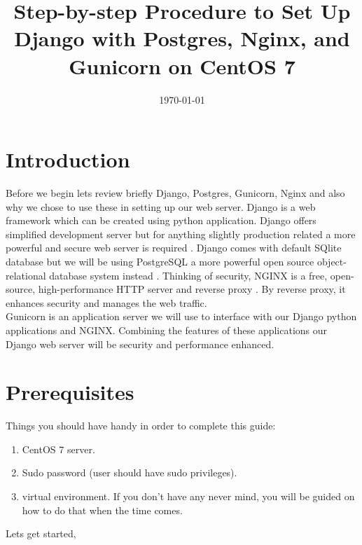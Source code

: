 \documentclass[a4paper]{article}
\title{Step-by-step Procedure to Set Up Django with Postgres, Nginx, and Gunicorn on CentOS 7}
\date{\today}
\begin{document}
\maketitle

\section*{Introduction}
 \label{introduction}
Before we begin lets review briefly Django, Postgres, Gunicorn, Nginx and also why we chose to use these in
setting up our web server.  Django is a web framework which can be created using python application. Django
offers simplified development server but for anything slightly production related a more powerful and
secure web server is required . 
Django comes with default SQlite database but we will be using PostgreSQL a more powerful open source
object-relational database system instead . Thinking of security, NGINX is a free, open-source, high-performance HTTP server and reverse proxy . By reverse proxy, it enhances security and manages the web
traffic.\\ 
Gunicorn is an application server we will use to interface with our Django python applications and NGINX. Combining the features of these applications our Django web server will be security and performance enhanced. \par

\section* {Prerequisites}
\label{prerequisite}
Things you should have handy in order to complete this guide:

\begin{enumerate}
	\item CentOS 7 server.
	\item Sudo password (user should have sudo privileges).
	\item virtual environment. If you don't have any never mind, you will be guided on how to do that when the time comes.\\
\end{enumerate}

Lets get started,\\
\end{document}
